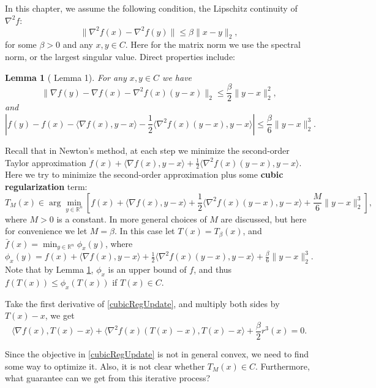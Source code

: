 \documentclass[openany]{book}
\newtheorem{lemma}{Lemma}[chapter]
\theoremstyle{definition}
\theoremstyle{remark}
\begin{document}
In this chapter, we assume the following condition, the Lipschitz continuity of $\nabla^2f$:
\begin{equation}
    \|\nabla^2f(x)-\nabla^2f(y)\|\le\beta\|x-y\|_2,
\end{equation}
for some $\beta>0$ and any $x,y\in C$. Here for the matrix norm we use the spectral norm, or the largest singular value. Direct properties include:
\begin{lemma}[\cite{NP06} Lemma 1]\label{thirdOrderUpperBound}
    For any $x,y\in C$ we have
    \begin{equation}
        \|\nabla f(y)-\nabla f(x)-\nabla^2f(x)(y-x)\|_2\le \frac{\beta}{2}\|y-x\|_2^2,
    \end{equation}
    and
    \begin{equation}
        |f(y)-f(x)-\langle\nabla f(x),y-x\rangle-\frac{1}{2}\langle\nabla^2f(x)(y-x),y-x\rangle|\le \frac{\beta}{6}\|y-x\|_2^3.
    \end{equation}
\end{lemma}

Recall that in Newton's method, at each step we minimize the second-order Taylor approximation $f(x)+\langle\nabla f(x),y-x\rangle+\frac{1}{2}\langle\nabla^2f(x)(y-x),y-x\rangle$. Here we try to minimize the second-order approximation plus some \textbf{cubic regularization} term:
\begin{equation}\label{cubicRegUpdate}
    T_M(x)\in\arg\min_{y\in \mathbb{R}^n}\left[f(x)+\langle\nabla f(x),y-x\rangle+\frac{1}{2}\langle\nabla^2f(x)(y-x),y-x\rangle+\frac{M}{6}\|y-x\|_2^3\right],
\end{equation}
where $M>0$ is a constant. In \cite{NP06} more general choices of $M$ are discussed, but here for convenience we let $M=\beta$. In this case let $T(x)=T_{\beta}(x)$, and $\bar{f}(x)=\min_{y\in \mathbb{R}^n}\phi_x(y)$, where $\phi_x(y)=f(x)+\langle\nabla f(x),y-x\rangle+\frac{1}{2}\langle\nabla^2f(x)(y-x),y-x\rangle+\frac{\beta}{6}\|y-x\|_2^3$. Note that by Lemma \ref{thirdOrderUpperBound}, $\phi_x$ is an upper bound of $f$, and thus $f(T(x))\le\phi_x(T(x))$ if $T(x)\in C$.

Take the first derivative of \eqref{cubicRegUpdate}, and multiply both sides by $T(x)-x$, we get
\begin{equation}\label{cubicRegFirstOrder}
    \langle\nabla f(x),T(x)-x\rangle+\langle\nabla^2f(x)(T(x)-x),T(x)-x\rangle+\frac{\beta}{2}r^3(x)=0.
\end{equation}

Since the objective in \eqref{cubicRegUpdate} is not in general convex, we need to find some way to optimize it. Also, it is not clear whether $T_M(x)\in C$. Furthermore, what guarantee can we get from this iterative process?
\end{document}
